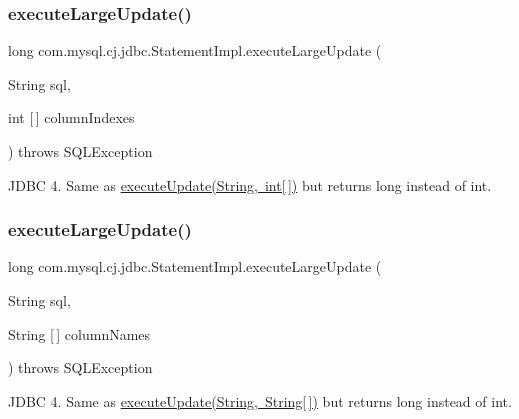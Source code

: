\subsubsection{\texorpdfstring{execute\+Large\+Update()}{executeLargeUpdate()}\hspace{0.1cm}{\footnotesize\ttfamily [3/4]}}
{\footnotesize\ttfamily long com.\+mysql.\+cj.\+jdbc.\+Statement\+Impl.\+execute\+Large\+Update (\begin{DoxyParamCaption}\item[{String}]{sql,  }\item[{int \mbox{[}$\,$\mbox{]}}]{column\+Indexes }\end{DoxyParamCaption}) throws S\+Q\+L\+Exception}

J\+D\+BC 4. Same as \mbox{\hyperlink{}{execute\+Update(\+String, int\mbox{[}$\,$\mbox{]})}} but returns long instead of int. \mbox{\label{classcom_1_1mysql_1_1cj_1_1jdbc_1_1_statement_impl_ac8be77a2303189e5efa1c5c9d34d0962}} 
\subsubsection{\texorpdfstring{execute\+Large\+Update()}{executeLargeUpdate()}\hspace{0.1cm}{\footnotesize\ttfamily [4/4]}}
{\footnotesize\ttfamily long com.\+mysql.\+cj.\+jdbc.\+Statement\+Impl.\+execute\+Large\+Update (\begin{DoxyParamCaption}\item[{String}]{sql,  }\item[{String \mbox{[}$\,$\mbox{]}}]{column\+Names }\end{DoxyParamCaption}) throws S\+Q\+L\+Exception}

J\+D\+BC 4. Same as \mbox{\hyperlink{}{execute\+Update(\+String, String\mbox{[}$\,$\mbox{]})}} but returns long instead of int. \mbox{\label{classcom_1_1mysql_1_1cj_1_1jdbc_1_1_statement_impl_ad8bdf41d3e788681fe1adcf961b176ef}} 
